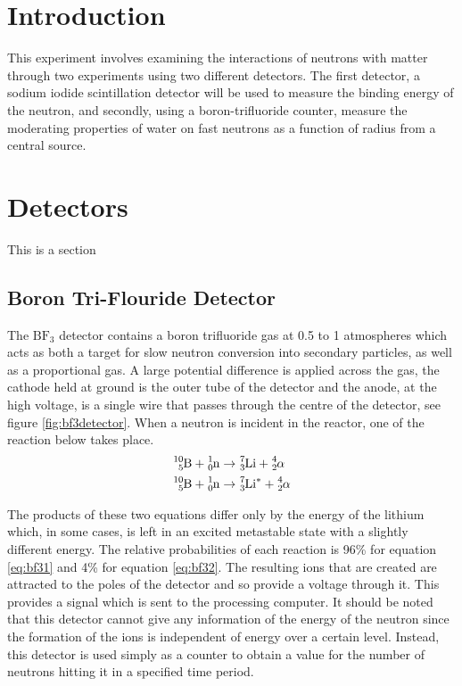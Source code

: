 
\section{Introduction} %
\label{sec:introduction}
This experiment involves examining the interactions of neutrons with matter through two experiments using two different detectors. The first detector, a sodium iodide scintillation detector will be used to measure the binding energy of the neutron, and secondly, using a boron-trifluoride counter, measure the moderating properties of water on fast neutrons as a function of radius from a central source.

\section{Detectors} %
\label{sec:detectors}
This is a section

\subsection{Boron Tri-Flouride Detector} %
\label{ssub:boron_tri_flouride_detector}
The $\text{BF}_3$ detector contains a boron trifluoride gas at 0.5 to 1 atmospheres which acts as both a target for slow neutron conversion into secondary particles, as well as a proportional gas. A large potential difference is applied across the gas, the cathode held at ground is the outer tube of the detector and the anode, at the high voltage, is a single wire that passes through the centre of the detector, see figure \ref{fig:bf3detector}. When a neutron is incident in the reactor, one of the reaction below takes place.
\begin{align}
	\cf{^{10}_{5}B} + \cf{^{1}_{0}n} &\rightarrow \cf{^{7}_{3}Li} + \cf{^{4}_{2}\alpha} \label{eq:bf31}\\
	\cf{^{10}_{5}B} + \cf{^{1}_{0}n} &\rightarrow \cf{^{7}_{3}Li^*} + \cf{^{4}_{2}\alpha} \label{eq:bf32}
\end{align} 

The products of these two equations differ only by the energy of the lithium which, in some cases, is left in an excited metastable state with a slightly different energy. The relative probabilities of each reaction is 96\% for equation \ref{eq:bf31} and 4\% for equation \ref{eq:bf32}. The resulting ions that are created are attracted to the poles of the detector and so provide a voltage through it. This provides a signal which is sent to the processing computer. It should be noted that this detector cannot give any information of the energy of the neutron since the formation of the ions is independent of energy over a certain level. Instead, this detector is used simply as a counter to obtain a value for the number of neutrons hitting it in a specified time period. 

